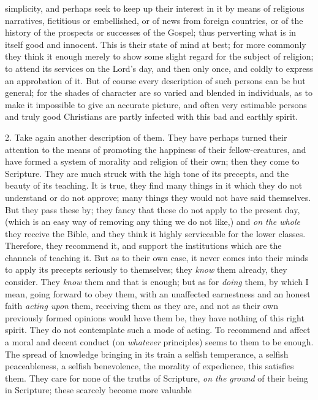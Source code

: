 simplicity, and perhaps seek to keep up their interest in
it by means of religious narratives, fictitious or
embellished, or of news from foreign countries, or of the
history of the prospects or successes of the Gospel; thus
perverting what is in itself good and innocent. This is
their state of mind at best; for more commonly they think
it enough merely to show some slight regard for the
subject of religion; to attend its services on the Lord's
day, and then only once, and coldly to express an
approbation of it. But of course every description of
such persons can be but general; for the shades of
character are so varied and blended in individuals, as to
make it impossible to give an accurate picture, and often
very estimable persons and truly good Christians are
partly infected with this bad and earthly spirit.

2. Take again another description of them. They have
perhaps turned their attention to the means of promoting
the happiness of their fellow-creatures, and have formed
a system of morality and religion of their own; then they
come to Scripture. They are much struck with the high
tone of its precepts, and the beauty of its teaching. It
is true, they find many things in it which they do not
understand or do not approve; many things they would not
have said themselves. But they pass these by; they fancy
that these do not apply to the present day, (which is an
easy way of removing any thing we do not like,) and \emph{on
the whole} they receive the Bible, and they think it
highly serviceable for the lower classes. Therefore, they
recommend it, and support the institutions which are the
channels of teaching it. But as to their own case, it
never comes into their minds to apply its precepts
seriously to themselves; they \emph{know} them already,
they consider. They \emph{know} them and that is
enough; but as for \emph{doing} them, by which I mean,
going forward to obey them, with an unaffected
earnestness and an honest faith \emph{acting upon}
them, receiving them as they are, and not as their own
previously formed opinions would have them be, they have
nothing of this right spirit. They do not contemplate
such a mode of acting. To recommend and affect a moral
and decent conduct (on \emph{whatever} principles)
seems to them to be enough. The spread of knowledge
bringing in its train a selfish temperance, a selfish
peaceableness, a selfish benevolence, the morality of
expedience, this satisfies them. They care for none of
the truths of Scripture, \emph{on the ground} of their
being in Scripture; these scarcely become more valuable
